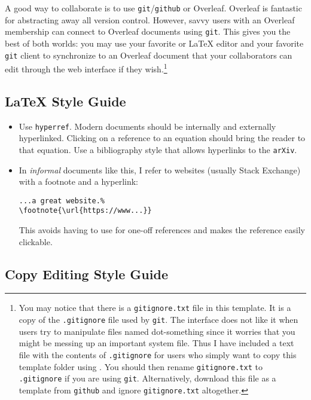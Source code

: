 A good way to collaborate is to use \texttt{git}/\texttt{github} or {Overleaf}. Overleaf is fantastic for abstracting away all version control. However, savvy users with an Overleaf membership can connect to Overleaf documents using \texttt{git}. This gives you the best of both worlds: you may use your favorite  or \LaTeX{} editor and your favorite \texttt{git} client to synchronize to an Overleaf document that your collaborators can edit through the web interface if they wish.\footnote{You may notice that there is a \texttt{gitignore.txt} file in this template. It is a copy of the \texttt{.gitignore} file used by \texttt{git}. The  interface does not like it when users try to manipulate files named dot-something since it worries that you might be messing up an important system file. Thus I have included a text file with the contents of \texttt{.gitignore} for users who simply want to copy this template folder using . You should then rename \texttt{gitignore.txt} to \texttt{.gitignore} if you are using \texttt{git}. Alternatively, download this file as a template from \texttt{github} and ignore \texttt{gitignore.txt} altogether.  }

\subsection{\texorpdfstring{\LaTeX{} Style Guide}{LaTeX Style Guide}}

\begin{itemize}
	\item Use \texttt{hyperref}. Modern documents should be internally and externally hyperlinked. Clicking on a reference to an equation should bring the reader to that equation. Use a bibliography style that allows hyperlinks to the \texttt{arXiv}.
	\item In \emph{informal} documents like this, I refer to websites (usually Stack Exchange) with a footnote and a hyperlink:
\begin{lstlisting}[style=latexstyle]
...a great website.%
\footnote{\url{https://www...}}
\end{lstlisting}
	This avoids having to use \BibTeX for one-off references and makes the reference easily clickable. 
\end{itemize}


\subsection{Copy Editing Style Guide}

